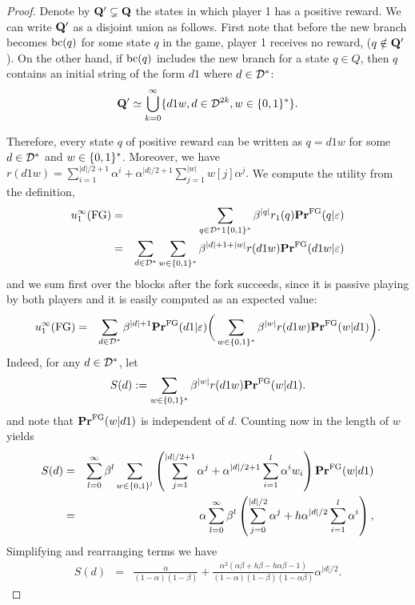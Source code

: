 \begin{proof}
	Denote by $\mathbf{Q}'\subsetneq \mathbf{Q}$ the states in which player 1 has a positive reward. We can write $\mathbf{Q}'$ as a disjoint union as follows. First note that before the new branch becomes $\text{bc}(q)$ for some state $q$ in the game, player 1 receives no reward, (\ie $q\notin \mathbf{Q}'$). On the other hand, if $\text{bc}(q)$ includes the new branch for a state $q\in Q$, then $q$ contains an initial string of the form $d1$ where $d\in \mathcal{D}^\ast$:
	$$\mathbf{Q}'\simeq \bigcup_{k=0}^\infty \{d1w,d\in \mathcal{D}^{2k},w\in \{0,1\}^\ast\}.$$

	Therefore, every state $q$ of positive reward can be written as $q=d1w$ for some $d\in \mathcal{D}^\ast$ and $w\in\{0,1\}^\ast$. Moreover, we have $r(d1w)=\sum_{i=1}^{|d|/2+1}\alpha^i + \alpha^{|d|/2+1}\sum_{j=1}^{|w|}w[j]\alpha^j.$ We compute the utility from the definition,
	\begin{eqnarray*}
		u^\infty_1(\text{\rm FG})&=&  \sum_{q\in \mathcal{D}^\ast 1\{0,1\}^\ast } \beta^{|q|}r_1(q)\mathbf{Pr}^{\text{\rm FG}}(q|\varepsilon) \\
    	               &=& \sum_{d\in \mathcal{D}^\ast}\sum_{w\in\{0,1\}^\ast}\beta^{|d|+1+|w|}r(d1w)\mathbf{Pr}^{\text{\rm FG}} (d1w|\varepsilon)
	\end{eqnarray*}    	               
		and we sum first over the blocks after the fork succeeds, since it is passive playing by both players and it is easily computed as an expected value:
	\begin{eqnarray*}
		u^\infty_1(\text{\rm FG})&=& \sum_{d\in \mathcal{D}^\ast}\beta ^{|d|+1}\mathbf{Pr}^{\text{\rm FG}} (d1|\varepsilon) \bigg(\sum_{w\in\{0,1\}^\ast}\beta^{|w|}r(d1w)\mathbf{Pr}^{\text{\rm FG}} (w|d1)\bigg).
	\end{eqnarray*}
Indeed, for any $d\in \mathcal{D}^\ast$, let
$$S(d):=\sum_{w\in \{0,1\}^\ast}\beta^{|w|}r(d1w)\mathbf{Pr}^{\text{\rm FG}}(w|d1).$$
and note that $\mathbf{Pr}^{\text{\rm FG}}(w|d1)$ is independent of $d$. Counting now in the length of $w$ yields 
\begin{eqnarray*}
	S(d)	  &=& \sum_{l=0}^{\infty}\beta^{l}\sum_{w\in \{0,1\}^l}\left(\sum_{j=1}^{|d|/2+1}\alpha^j + \alpha^{|d|/2+1}\sum_{i=1}^{l}\alpha^iw_i\right)\mathbf{Pr}^{\text{\rm FG}}(w|d1)\\
          &=& \alpha\sum_{l=0}^{\infty}\beta^{l}\left(\sum_{j=0}^{|d|/2}\alpha^j + h\alpha^{|d|/2}\sum_{i=1}^{l}\alpha^i\right),
\end{eqnarray*}
Simplifying and rearranging terms we have
\begin{eqnarray*}
S(d)    &=& \frac{\alpha}{(1-\alpha)(1-\beta)}+\frac{\alpha^2(\alpha\beta+h\beta-h\alpha\beta-1)}{(1-\alpha)(1-\beta)(1-\alpha\beta)}\alpha^{|d|/2}.

\end{eqnarray*}
\end{proof}
